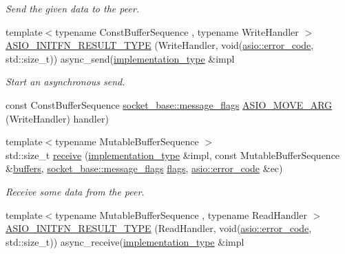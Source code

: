 \begin{DoxyCompactItemize}
\begin{DoxyCompactList}\small\item\em Send the given data to the peer. \end{DoxyCompactList}\item 
{\footnotesize template$<$typename Const\+Buffer\+Sequence , typename Write\+Handler $>$ }\\\hyperlink{classasio_1_1stream__socket__service_a0ac37718036bcb4b695d0598888668ef}{A\+S\+I\+O\+\_\+\+I\+N\+I\+T\+F\+N\+\_\+\+R\+E\+S\+U\+L\+T\+\_\+\+T\+Y\+P\+E} (Write\+Handler, void(\hyperlink{classasio_1_1error__code}{asio\+::error\+\_\+code}, std\+::size\+\_\+t)) async\+\_\+send(\hyperlink{classasio_1_1stream__socket__service_a3e2c55b4aaf6bab6dfa83c8dbf5b236a}{implementation\+\_\+type} \&impl
\begin{DoxyCompactList}\small\item\em Start an asynchronous send. \end{DoxyCompactList}\item 
const Const\+Buffer\+Sequence \hyperlink{classasio_1_1socket__base_ac3cf77465dfedfe1979b5415cf32cc94}{socket\+\_\+base\+::message\+\_\+flags} \hyperlink{classasio_1_1stream__socket__service_a984f455cc859f2617f453042465aab7e}{A\+S\+I\+O\+\_\+\+M\+O\+V\+E\+\_\+\+A\+R\+G} (Write\+Handler) handler)
\item 
{\footnotesize template$<$typename Mutable\+Buffer\+Sequence $>$ }\\std\+::size\+\_\+t \hyperlink{classasio_1_1stream__socket__service_ad22a8d07913f69bc17055b463df6b7b5}{receive} (\hyperlink{classasio_1_1stream__socket__service_a3e2c55b4aaf6bab6dfa83c8dbf5b236a}{implementation\+\_\+type} \&impl, const Mutable\+Buffer\+Sequence \&\hyperlink{classasio_1_1stream__socket__service_a2b418591be64237dabe9260a184d2a2a}{buffers}, \hyperlink{classasio_1_1socket__base_ac3cf77465dfedfe1979b5415cf32cc94}{socket\+\_\+base\+::message\+\_\+flags} \hyperlink{classasio_1_1stream__socket__service_ab3077e35cb3e3ff867fb8c45233f7d69}{flags}, \hyperlink{classasio_1_1error__code}{asio\+::error\+\_\+code} \&ec)
\begin{DoxyCompactList}\small\item\em Receive some data from the peer. \end{DoxyCompactList}\item 
{\footnotesize template$<$typename Mutable\+Buffer\+Sequence , typename Read\+Handler $>$ }\\\hyperlink{classasio_1_1stream__socket__service_adff2df9192df682a804c2174e62699ac}{A\+S\+I\+O\+\_\+\+I\+N\+I\+T\+F\+N\+\_\+\+R\+E\+S\+U\+L\+T\+\_\+\+T\+Y\+P\+E} (Read\+Handler, void(\hyperlink{classasio_1_1error__code}{asio\+::error\+\_\+code}, std\+::size\+\_\+t)) async\+\_\+receive(\hyperlink{classasio_1_1stream__socket__service_a3e2c55b4aaf6bab6dfa83c8dbf5b236a}{implementation\+\_\+type} \&impl

\end{DoxyCompactItemize}
